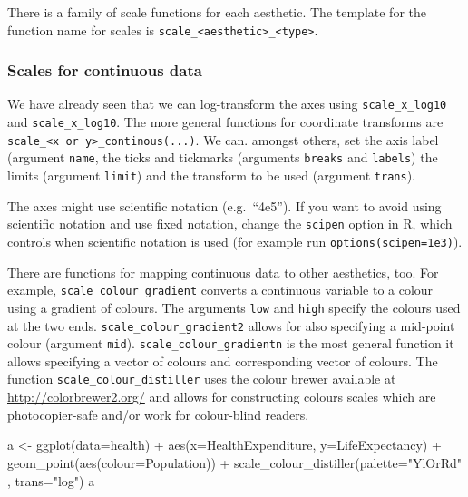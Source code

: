 \documentclass[
]{book}
\newenvironment{Shaded}{\begin{snugshade}}{\end{snugshade}}
\newcommand{\AttributeTok}[1]{\textcolor[rgb]{0.77,0.63,0.00}{#1}}
\newcommand{\FunctionTok}[1]{\textcolor[rgb]{0.00,0.00,0.00}{#1}}
\newcommand{\NormalTok}[1]{#1}
\newcommand{\OtherTok}[1]{\textcolor[rgb]{0.56,0.35,0.01}{#1}}
\newcommand{\SpecialCharTok}[1]{\textcolor[rgb]{0.00,0.00,0.00}{#1}}
\newcommand{\StringTok}[1]{\textcolor[rgb]{0.31,0.60,0.02}{#1}}
\begin{document}
There is a family of scale functions for each aesthetic. The template for the function name for scales is \texttt{scale\_\textless{}aesthetic\textgreater{}\_\textless{}type\textgreater{}}.

\hypertarget{scales-for-continuous-data}{%
\subsubsection{Scales for continuous data}\label{scales-for-continuous-data}}

We have already seen that we can log-transform the axes using \texttt{scale\_x\_log10} and \texttt{scale\_x\_log10}. The more general functions for coordinate transforms are \texttt{scale\_\textless{}x\ or\ y\textgreater{}\_continous(...)}. We can. amongst others, set the axis label (argument \texttt{name}, the ticks and tickmarks (arguments \texttt{breaks} and \texttt{labels}) the limits (argument \texttt{limit}) and the transform to be used (argument \texttt{trans}).

The axes might use scientific notation (e.g.~``4e5''). If you want to avoid using scientific notation and use fixed notation, change the \texttt{scipen} option in R, which controls when scientific notation is used (for example run \texttt{options(scipen=1e3)}).

There are functions for mapping continuous data to other aesthetics, too. For example, \texttt{scale\_colour\_gradient} converts a continuous variable to a colour using a gradient of colours. The arguments \texttt{low} and \texttt{high} specify the colours used at the two ends. \texttt{scale\_colour\_gradient2} allows for also specifying a mid-point colour (argument \texttt{mid}). \texttt{scale\_colour\_gradientn} is the most general function it allows specifying a vector of colours and corresponding vector of colours. The function \texttt{scale\_colour\_distiller} uses the colour brewer available at \href{colorbrewer.org}{http://colorbrewer2.org/} and allows for constructing colours scales which are photocopier-safe and/or work for colour-blind readers.

\begin{Shaded}
\begin{Highlighting}[]
\NormalTok{a }\OtherTok{\textless{}{-}} \FunctionTok{ggplot}\NormalTok{(}\AttributeTok{data=}\NormalTok{health) }\SpecialCharTok{+}
         \FunctionTok{aes}\NormalTok{(}\AttributeTok{x=}\NormalTok{HealthExpenditure, }\AttributeTok{y=}\NormalTok{LifeExpectancy) }\SpecialCharTok{+}
         \FunctionTok{geom\_point}\NormalTok{(}\FunctionTok{aes}\NormalTok{(}\AttributeTok{colour=}\NormalTok{Population)) }\SpecialCharTok{+}
         \FunctionTok{scale\_colour\_distiller}\NormalTok{(}\AttributeTok{palette=}\StringTok{"YlOrRd"}\NormalTok{ , }\AttributeTok{trans=}\StringTok{"log"}\NormalTok{)}
\NormalTok{a}
\end{Highlighting}
\end{Shaded}
\end{document}
